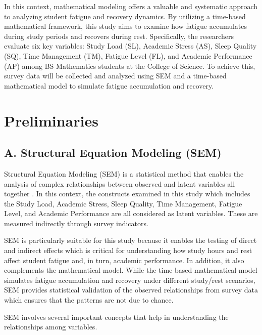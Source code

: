 \documentclass [12pt]{article}
\begin{document}
In this context, mathematical modeling offers a valuable and systematic approach to analyzing student fatigue and recovery dynamics. By utilizing a time-based mathematical framework, this study aims to examine how fatigue accumulates during study periods and recovers during rest. Specifically, the researchers evaluate six key variables: Study Load (SL), Academic Stress (AS), Sleep Quality (SQ), Time Management (TM), Fatigue Level (FL), and Academic Performance (AP) among BS Mathematics students at the College of Science. To achieve this, survey data will be collected and analyzed using SEM and a time-based mathematical model to simulate fatigue accumulation and recovery. 

\section*{Preliminaries}

\subsection*{A. Structural Equation Modeling (SEM)}

Structural Equation Modeling (SEM) is a statistical method that enables the analysis of complex relationships between observed and latent variables all together \parencite{geeksforgeeks_sem_overview2025}. In this context, the constructs examined in this study which includes the Study Load, Academic Stress, Sleep Quality, Time Management, Fatigue Level, and Academic Performance are all considered as latent variables. These are measured indirectly through survey indicators. 

SEM is particularly suitable for this study because it enables the testing of direct and indirect effects which is critical for understanding how study hours and rest affect student fatigue and, in turn, academic performance. In addition, it also complements the mathematical model. While the time-based mathematical model simulates fatigue accumulation and recovery under different study/rest scenarios, SEM provides statistical validation of the observed relationships from survey data which ensures that the patterns are not due to chance. 

SEM involves several important concepts that help in understanding the relationships among variables. 
\end{document}
